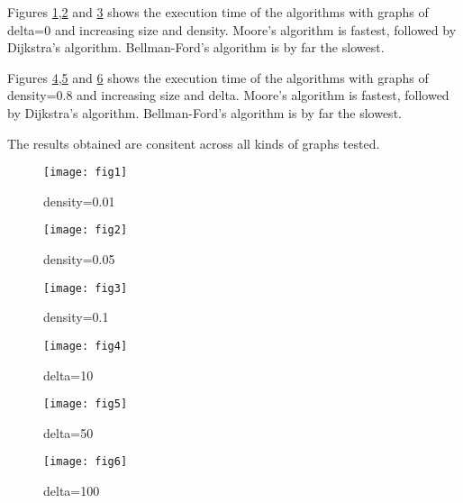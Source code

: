 Figures \ref{fig:spp1},\ref{fig:spp2} and \ref{fig:spp3} shows the execution time of the algorithms
with graphs of delta=0 and increasing size and density.
Moore's algorithm is fastest, followed by Dijkstra's algorithm. Bellman-Ford's algorithm is by far the slowest.

Figures \ref{fig:spp4},\ref{fig:spp5} and \ref{fig:spp6} shows the execution time of the algorithms
with graphs of density=0.8 and increasing size and delta.
Moore's algorithm is fastest, followed by Dijkstra's algorithm. Bellman-Ford's algorithm is by far the slowest.

The results obtained are consitent across all kinds of graphs tested.

\begin{figure}
\texttt{[image: fig1]}
\caption{density=0.01}\label{fig:spp1}
\end{figure}
\begin{figure}
\texttt{[image: fig2]}
\caption{density=0.05}\label{fig:spp2}
\end{figure}
\begin{figure}
\texttt{[image: fig3]}
\caption{density=0.1}\label{fig:spp3}
\end{figure}
\begin{figure}
\texttt{[image: fig4]}
\caption{delta=10}\label{fig:spp4}
\end{figure}
\begin{figure}
\texttt{[image: fig5]}
\caption{delta=50}\label{fig:spp5}
\end{figure}
\begin{figure}
\texttt{[image: fig6]}
\caption{delta=100}\label{fig:spp6}
\end{figure}
